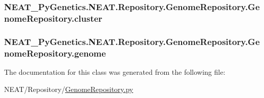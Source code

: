 \subsubsection[{\texorpdfstring{cluster}{cluster}}]{\setlength{\rightskip}{0pt plus 5cm}N\+E\+A\+T\+\_\+\+Py\+Genetics.\+N\+E\+A\+T.\+Repository.\+Genome\+Repository.\+Genome\+Repository.\+cluster\hspace{0.3cm}{\ttfamily [static]}}\hypertarget{classNEAT__PyGenetics_1_1NEAT_1_1Repository_1_1GenomeRepository_1_1GenomeRepository_a8932d6257b6a5e28ddc6aa822585eef0}{}\label{classNEAT__PyGenetics_1_1NEAT_1_1Repository_1_1GenomeRepository_1_1GenomeRepository_a8932d6257b6a5e28ddc6aa822585eef0}
\subsubsection[{\texorpdfstring{genome}{genome}}]{\setlength{\rightskip}{0pt plus 5cm}N\+E\+A\+T\+\_\+\+Py\+Genetics.\+N\+E\+A\+T.\+Repository.\+Genome\+Repository.\+Genome\+Repository.\+genome\hspace{0.3cm}{\ttfamily [static]}}\hypertarget{classNEAT__PyGenetics_1_1NEAT_1_1Repository_1_1GenomeRepository_1_1GenomeRepository_a23662b9337cfca1f402b206989747f45}{}\label{classNEAT__PyGenetics_1_1NEAT_1_1Repository_1_1GenomeRepository_1_1GenomeRepository_a23662b9337cfca1f402b206989747f45}


The documentation for this class was generated from the following file\+:\begin{DoxyCompactItemize}
\item 
N\+E\+A\+T/\+Repository/\hyperlink{GenomeRepository_8py}{Genome\+Repository.\+py}\end{DoxyCompactItemize}
